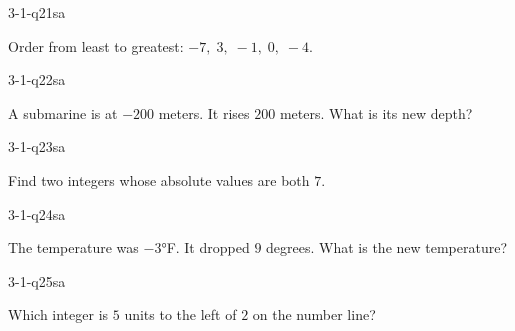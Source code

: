 \begin{practiceQuestion}{3-1-q21}{sa}
\begin{questionText}
Order from least to greatest: $-7, \; 3, \; -1, \; 0, \; -4$.
\end{questionText}
\end{practiceQuestion}

\begin{practiceQuestion}{3-1-q22}{sa}
\begin{questionText}
A submarine is at $-200$ meters. It rises $200$ meters. What is its new depth?
\end{questionText}
\end{practiceQuestion}

\begin{practiceQuestion}{3-1-q23}{sa}
\begin{questionText}
Find two integers whose absolute values are both $7$.
\end{questionText}
\end{practiceQuestion}

\begin{practiceQuestion}{3-1-q24}{sa}
\begin{questionText}
The temperature was $-3°$F. It dropped $9$ degrees. What is the new temperature?
\end{questionText}
\end{practiceQuestion}

\begin{practiceQuestion}{3-1-q25}{sa}
\begin{questionText}
Which integer is $5$ units to the left of $2$ on the number line?
\end{questionText}
\end{practiceQuestion}


